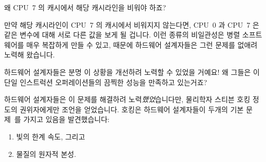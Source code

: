 \begin{enumerate}

\QuickQ{}
	왜 CPU~7 의 캐시에서 해당 캐시라인을 비워야 하죠?

\QuickA{}
	만약 해당 캐시라인이 CPU~7 의 캐시에서 비워지지 않는다면, CPU~0 과
	CPU~7 은 같은 변수에 대해 서로 다른 값을 보게 될 겁니다.
	이런 종류의 비일관성은 병렬 소프트웨어를 매우 복잡하게 만들 수 있고,
	때문에 하드웨어 설계자들은 그런 문제를 없애려 노력해 왔습니다.

\QuickQ{}
	하드웨어 설계자들은 분명 이 상황을 개선하려 노력할 수 있었을 거예요!
	왜 그들은 이 단일 인스트럭션 오퍼레이션들의 끔찍한 성능을 만족하고
	있는거죠?

\QuickA{}
	하드웨어 설계자들은 이 문제를 해결하려 노력\emph{했었}습니다만,
	물리학자 스티븐 호킹 정도의 권위자에게만 조언을 얻었습니다.
	호킹은 하드웨어 설계자들이 두개의 기본 문제~\cite{BryanGardiner2007}를
	가지고 있음을 발견했습니다:

	\begin{enumerate}
	\item	빛의 한계 속도, 그리고
	\item	물질의 원자적 본성.
	\end{enumerate}

\end{enumerate}
